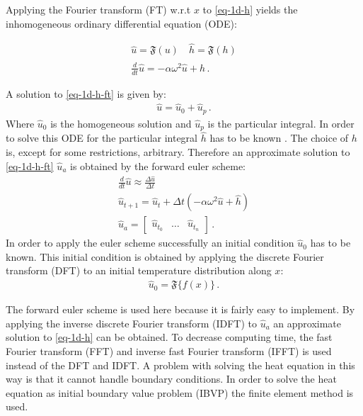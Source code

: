 Applying the Fourier transform (FT) w.r.t \(x\) to \ref{eq-1d-h} yields the inhomogeneous ordinary differential equation (ODE):

\begin{gather}
\hat{u} = \mathfrak{F}(u) \quad \hat{h} = \mathfrak{F}(h) \\
\frac{d}{dt} \hat{u} = -\alpha\omega^{2}\hat{u} + \hat{h}\,. \label{eq-1d-h-ft}
\end{gather}

A solution to \ref{eq-1d-h-ft} is given by:
\begin{gather}
\hat{u} = \hat{u}_{0} + \hat{u}_{p}\,.
\end{gather}
Where \(\hat{u}_{0}\) is the homogeneous solution and \(\hat{u}_{p}\) is the particular integral.
In order to solve this ODE for the particular integral \(\hat{h}\) has to be known \cite{Papula2015}.
The choice of \(h\) is, except for some restrictions, arbitrary.
Therefore an approximate solution to \ref{eq-1d-h-ft} \(\hat{u}_{a}\) is obtained by the forward euler scheme:
\begin{gather}
\frac{d}{dt} \hat{u} \approx \frac{\Delta \hat{u}}{\Delta t} \\
\hat{u}_{t+1} = \hat{u}_{t} + \Delta t (-\alpha\omega^{2}\hat{u} + \hat{h}) \label{eq-1d-h-es} \\
\hat{u}_{a} = \begin{bmatrix}
\hat{u}_{t_{0}} & \hdots & \hat{u}_{t_{n}}
\end{bmatrix}\,.
\end{gather}
In order to apply the euler scheme successfully an initial condition   \(\hat{u}_{0}\) has to be known. 
This initial condition is obtained by applying the discrete Fourier transform (DFT) to an initial temperature distribution along \(x\):
\begin{gather}
\hat{u}_{0} = \mathfrak{F} \{f(x)\}\,.
\end{gather} 
\cite{Gustafsson2011b}

The forward euler scheme is used here because it is fairly easy to implement.
By applying the  inverse discrete Fourier transform (IDFT) to \(\hat{u}_{a}\) an approximate solution to \ref{eq-1d-h} can be obtained.
To decrease computing time, the fast Fourier transform (FFT) and inverse fast Fourier transform (IFFT) is used instead of the DFT and IDFT.
A problem with solving the heat equation in this way is that it cannot handle boundary conditions.
In order to solve the heat equation as initial boundary value problem (IBVP) the finite element method is used.